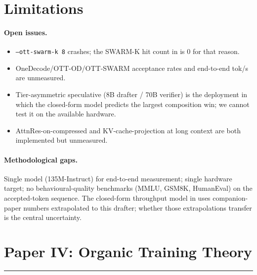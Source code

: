 \documentclass[11pt]{article}
\begin{document}
\section{Limitations}
\label{sec:status}
\paragraph{Open issues.}
\begin{itemize}
\item \texttt{--ott-swarm-k 8} crashes; the SWARM-K hit count in
 is $0$ for that reason.
\item OneDecode/OTT-OD/OTT-SWARM acceptance rates and end-to-end tok/s
are unmeasured.
\item Tier-asymmetric speculative (8B drafter / 70B verifier) is the
deployment in which the closed-form model predicts the largest
composition win; we cannot test it on the available hardware.
\item AttnRes-on-compressed and KV-cache-projection at long context are
both implemented but unmeasured.
\end{itemize}

\paragraph{Methodological gaps.}  Single model (135M-Instruct) for
end-to-end measurement; single hardware target; no behavioural-quality
benchmarks (MMLU, GSM8K, HumanEval) on the accepted-token sequence.  The
closed-form throughput model in  uses
companion-paper numbers extrapolated to this drafter; whether those
extrapolations transfer is the central uncertainty.

\clearpage
\printbibliography

\newpage



\newpage
\section{Paper IV: Organic Training Theory}
\vspace{6pt}
\hrule
\vspace{12pt}

\hypertensorbanner
\end{document}
